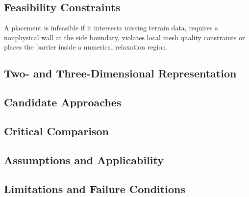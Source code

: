 \subsection{Feasibility Constraints}
\label{sec:res-geo-arr-feasibility-constraints}

A placement is infeasible if it intersects missing terrain data,
requires a nonphysical wall at the side boundary, violates local mesh
quality constraints or places the barrier inside a numerical
relaxation region.

\subsection{Two- and Three-Dimensional Representation}
\label{sec:res-geo-arr-two-three-dimensional-representation}


\subsection{Candidate Approaches}
\label{sec:res-geo-arr-candidate-approaches}


\subsection{Critical Comparison}
\label{sec:res-geo-arr-critical-comparison}


\subsection{Assumptions and Applicability}
\label{sec:res-geo-arr-assumptions}


\subsection{Limitations and Failure Conditions}
\label{sec:res-geo-arr-limitations}



